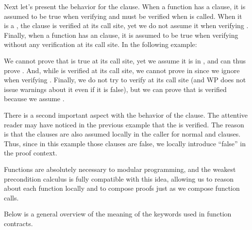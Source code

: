 Next let's present the behavior for the  clause. When a
function  has a  clause, it is assumed to be
true when verifying  and must be verified when  is
called. When it is a , the clause is verified at
its call site, yet we do not assume it when verifying . Finally, when
a function  has an  clause, it is
assumed to be true when verifying  without any verification
at its call site. In the following example:



We cannot prove that  is true at its call site, yet we
assume it is in
, and can thus prove . And, while
 is verified at its call site, we cannot prove  in
 since we ignore  when verifying .
Finally, we do not try to verify  at its call site (and WP does not
issue warnings about it even if it is false), but we can prove that  is
verified because we assume .


There is a second important aspect with the behavior of the 
clause. The attentive reader may have noticed in the previous example that the
 is verified. The reason is that the
 clauses are also assumed locally in the caller for normal
and   clauses. Thus, since in this
example those  clauses are false, we locally introduce
``false'' in the proof context.




Functions are absolutely necessary to modular programming, and the weakest
precondition calculus is fully compatible with this idea, allowing us to reason
about each function locally and to compose proofs just as we compose function
calls.


Below is a general overview of the meaning of the keywords used
in function contracts.



